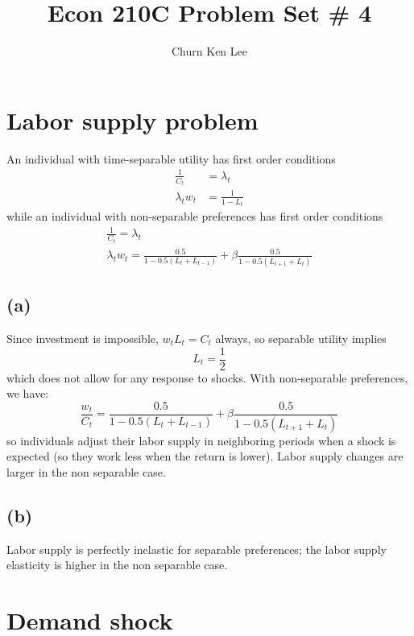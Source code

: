 \documentclass[12pt]{article}
\title{Econ 210C Problem Set \# 4}
\author{Churn Ken Lee}
\begin{document}
\maketitle

\section{Labor supply problem}
An individual with time-separable utility has first order conditions
\begin{align*}
\frac{1}{C_t} &= \lambda_t  \\
\lambda_t w_t &= \frac{1}{1-L_t} 
\end{align*}
while an individual with non-separable preferences has first order conditions
\begin{gather*}
\frac{1}{C_t} = \lambda_t  \\
\lambda_t w_t = \frac{0.5}{1 - 0.5 \left( L_t + L_{t-1} \right)} + \beta \frac{0.5}{1 - 0.5 \left( L_{t+1} + L_t \right)}
\end{gather*}
\subsection*{(a)}
	Since investment is impossible, $w_t L_t = C_t$ always, so separable utility implies 
	\begin{equation*}
	L_t = \frac{1}{2}
	\end{equation*}
	which does not allow for any response to shocks. 
	With non-separable preferences, we have:
	\begin{equation*}
	\frac{w_t}{C_t}  = \frac{0.5}{1 - 0.5 \left( L_t + L_{t-1} \right)} + \beta \frac{0.5}{1 - 0.5 \left( L_{t+1} + L_t \right)}
	\end{equation*}
	so individuals adjust their labor supply in neighboring periods when a shock is expected (so they work less when the return is lower).
	Labor supply changes are larger in the non separable case. 
	
\subsection*{(b)} 
Labor supply is perfectly inelastic for separable preferences; the labor supply elasticity is higher in the non separable case. 

\section{Demand shock}
\end{document}
